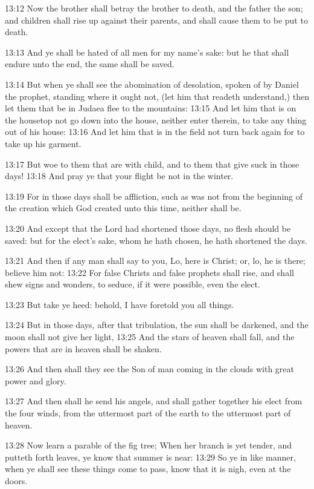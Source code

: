 13:12 Now the brother shall betray the brother to death, and the
father the son; and children shall rise up against their parents, and
shall cause them to be put to death.

13:13 And ye shall be hated of all men for my name's sake: but he that
shall endure unto the end, the same shall be saved.

13:14 But when ye shall see the abomination of desolation, spoken of
by Daniel the prophet, standing where it ought not, (let him that
readeth understand,) then let them that be in Judaea flee to the
mountains: 13:15 And let him that is on the housetop not go down into
the house, neither enter therein, to take any thing out of his house:
13:16 And let him that is in the field not turn back again for to take
up his garment.

13:17 But woe to them that are with child, and to them that give suck
in those days!  13:18 And pray ye that your flight be not in the
winter.

13:19 For in those days shall be affliction, such as was not from the
beginning of the creation which God created unto this time, neither
shall be.

13:20 And except that the Lord had shortened those days, no flesh
should be saved: but for the elect's sake, whom he hath chosen, he
hath shortened the days.

13:21 And then if any man shall say to you, Lo, here is Christ; or,
lo, he is there; believe him not: 13:22 For false Christs and false
prophets shall rise, and shall shew signs and wonders, to seduce, if
it were possible, even the elect.

13:23 But take ye heed: behold, I have foretold you all things.

13:24 But in those days, after that tribulation, the sun shall be
darkened, and the moon shall not give her light, 13:25 And the stars
of heaven shall fall, and the powers that are in heaven shall be
shaken.

13:26 And then shall they see the Son of man coming in the clouds with
great power and glory.

13:27 And then shall he send his angels, and shall gather together his
elect from the four winds, from the uttermost part of the earth to the
uttermost part of heaven.

13:28 Now learn a parable of the fig tree; When her branch is yet
tender, and putteth forth leaves, ye know that summer is near: 13:29
So ye in like manner, when ye shall see these things come to pass,
know that it is nigh, even at the doors.

